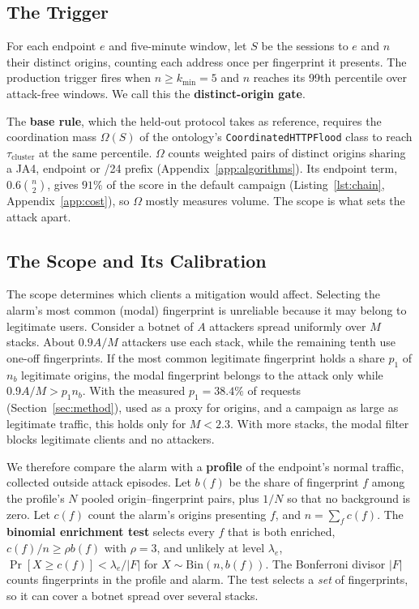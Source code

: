 \documentclass[conference,letterpaper,10pt]{IEEEtran}
\newcommand\1{\textit{(i)}}
\newcommand\2{\textit{(ii)}}
\newcommand\3{\textit{(iii)}}
\newcommand\4{\textit{(iv)}}
\newcommand\5{\textit{(v)}}
\newcommand\6{\textit{(vi)}}
\newcommand\7{\textit{(vii)}}
\newcommand\8{\textit{(viii)}}
\newcommand\9{\textit{(ix)}}
\begin{document}
\subsection{The Trigger}
\label{sec:rule}

For each endpoint $e$ and five-minute window, let $S$ be the
sessions to $e$ and $n$ their distinct origins,
counting each address once per fingerprint it presents.
The production trigger fires when $n \geq k_{\min}=5$
and $n$ reaches its 99th percentile over attack-free
windows. We call this the \textbf{distinct-origin gate}.

The \textbf{base rule}, which the held-out protocol takes as
reference, requires the coordination
mass $\Omega(S)$ of the ontology's
\texttt{CoordinatedHTTPFlood} class to reach
$\tau_{\mathrm{cluster}}$ at the same percentile. $\Omega$
counts weighted pairs of distinct
origins sharing a JA4, endpoint or /24 prefix
(Appendix~\ref{app:algorithms}). Its endpoint term,
$0.6\binom{n}{2}$, gives $91\%$ of the score in the default
campaign (Listing~\ref{lst:chain}, Appendix~\ref{app:cost}),
so $\Omega$ mostly measures volume. The scope is what sets
the attack apart.

\subsection{The Scope and Its Calibration}
\label{sec:evidence}

The scope determines which clients a mitigation would
affect. Selecting the alarm's most common (modal)
fingerprint is unreliable because it may belong to
legitimate users. Consider a botnet of $A$ attackers spread
uniformly over $M$ stacks. About $0.9A/M$ attackers use each
stack, while
the remaining tenth use one-off fingerprints. If the most
common legitimate fingerprint holds a share
$p_1$ of $n_b$ legitimate origins, the modal fingerprint
belongs to the attack only while $0.9A/M > p_1n_b$.
With the measured $p_1=38.4\%$ of requests
(Section~\ref{sec:method}), used as a proxy for origins,
and a campaign as large as legitimate traffic, this
holds only for $M<2.3$. With more stacks, the modal filter
blocks legitimate clients and no attackers.

We therefore compare the alarm with a \textbf{profile} of
the endpoint's normal traffic, collected outside attack
episodes.
Let $b(f)$ be the share of fingerprint $f$ among the
profile's $N$ pooled origin--fingerprint pairs, plus $1/N$
so that no background is zero. Let
$c(f)$ count the alarm's origins presenting $f$, and
$n=\sum_f c(f)$. The \textbf{binomial enrichment test}
selects every $f$ that is both enriched, $c(f)/n \geq \rho
b(f)$ with $\rho=3$, and unlikely at level $\lambda_e$,
$\Pr[X\geq c(f)]<\lambda_e/|F|$ for
$X\sim\mathrm{Bin}(n,b(f))$. The Bonferroni divisor
$|F|$ counts fingerprints in the profile and alarm.
The test selects a \textit{set} of fingerprints, so it can cover a
botnet spread over several stacks.
\end{document}
